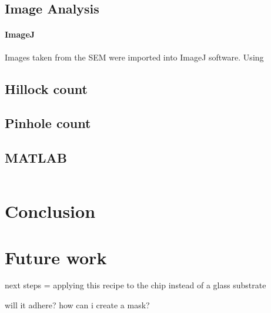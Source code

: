 \documentclass{article}
\begin{document}
\subsection{Image Analysis}

\paragraph*{ImageJ} 


Images taken from the SEM were imported into ImageJ software. Using

\subsection*{Hillock count}


\subsection*{Pinhole count}



\subsection*{MATLAB}


\begin{lstlisting}[caption = {sample.m script calculates so and so (TITLE)}]
    %%%%%%% You paste your code here %%%%%%%
\end{lstlisting}

\section{Conclusion}

\section{Future work}
next steps = applying this recipe to the chip instead of a glass substrate 

will it adhere? how can i create a mask? 

\newpage


% 


\newpage
\renewcommand{\theequation}{A.\arabic{equation}}
\end{document}
